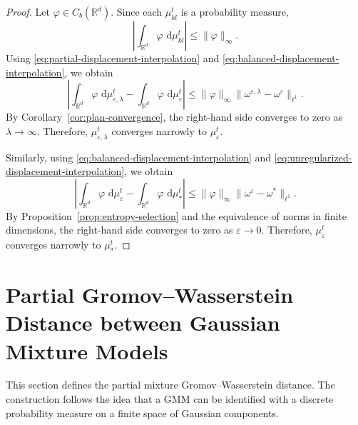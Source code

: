 \documentclass[a4paper,11pt]{article}
\numberwithin{equation}{section}
\newcommand{\eps}{\varepsilon}
\newcommand{\RR}{\mathbb{R}}
\newcommand{\dd}{\,\mathrm{d}}
\begin{document}
\begin{proof}
Let $\varphi\in C_b(\RR^d)$. Since each $\mu^t_{kl}$ is a probability measure,
\begin{equation*}
\left|\int_{\RR^d}\varphi\,\dd\mu^t_{kl}\right|\leq\|\varphi\|_{\infty}.
\end{equation*}
Using \eqref{eq:partial-displacement-interpolation} and \eqref{eq:balanced-displacement-interpolation}, we obtain
\begin{equation*}
  \left|\int_{\RR^d}\varphi\,\dd\mu^t_{\eps,\lambda}-\int_{\RR^d}\varphi\,\dd\mu^t_{\eps}\right| \leq \|\varphi\|_{\infty}\|\omega^{\eps,\lambda}-\omega^\eps\|_{\ell^1}.
\end{equation*}
By Corollary~\ref{cor:plan-convergence}, the right-hand side converges to zero as $\lambda \to \infty$. Therefore, $\mu^t_{\eps,\lambda}$ converges narrowly to $\mu^t_{\eps}$.

Similarly, using \eqref{eq:balanced-displacement-interpolation} and \eqref{eq:unregularized-displacement-interpolation}, we obtain
\begin{equation*}
  \left|\int_{\RR^d}\varphi\,\dd\mu^t_{\eps}-\int_{\RR^d}\varphi\,\dd\mu^t_*\right| \leq \|\varphi\|_{\infty}\|\omega^\eps-\omega^*\|_{\ell^1}.
\end{equation*}
By Proposition~\ref{prop:entropy-selection} and the equivalence of norms in finite dimensions, the right-hand side converges to zero as $\eps \to 0$. Therefore, $\mu^t_{\eps}$ converges narrowly to $\mu^t_*$.
\end{proof}


\section{Partial Gromov--Wasserstein Distance between Gaussian Mixture Models}\label{sec:pmgw}
This section defines the partial mixture Gromov--Wasserstein distance. The construction follows the idea that a GMM can be identified with a discrete probability measure on a finite space of Gaussian components.
\end{document}
